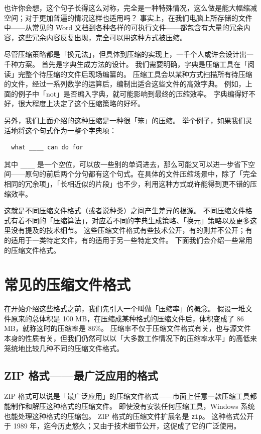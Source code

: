 也许你会想，这个句子长得这么对称，完全是一种特殊情况，这么做是能大幅缩减空间；对于更加普遍的情况这样也适用吗？
事实上，在我们电脑上所存储的文件中——从常见的 Word 文档到各种各样的可执行文件——都包含有大量的冗余内容，这些冗余内容反复出现，完全可以用这种方式被压缩。

尽管压缩策略都是「换元法」，但具体到压缩的实现上，一千个人或许会设计出一千种方案。
首先是字典生成方法的设计。
我们需要明确，字典是压缩工具在「阅读」完整个待压缩的文件后现场编纂的。
压缩工具会以某种方式扫描所有待压缩的文件，经过一系列数学的运算后，编制出适合这些文件的高效字典。
例如，上面的例子中「not」是否编入字典，就可能影响到最终的压缩效率。
字典编得好不好，很大程度上决定了这个压缩策略的好坏。

另外，我们上面介绍的这种压缩是一种很「笨」的压缩。
举个例子，如果我们灵活地将这个句式作为一整个字典项：

\begin{verbatim}
  what ____ can do for
\end{verbatim}

其中 \verb|____| 是一个空位，可以放一些别的单词进去，那么可能又可以进一步省下空间——原句的前后两个分句都有这个句式。在具体的文件压缩场景中，除了「完全相同的冗余项」，「长相近似的片段」也不少，利用这种方式或许能得到更不错的压缩效率。

这就是不同压缩文件格式（或者说种类）之间产生差异的根源。
不同压缩文件格式有着不同的「压缩算法」，对应着不同的字典生成策略、「换元」策略以及更多这里没有提及的技术细节。
这些压缩文件格式有些技术公开，有的则并不公开；有的适用于一类特定文件，有的适用于另一些特定文件。
下面我们会介绍一些常用的压缩文件格式。

\section{常见的压缩文件格式}

在开始介绍这些格式之前，我们先引入一个叫做「压缩率」的概念。
假设一堆文件原来的总体积是 100 MB，在压缩成某种格式的压缩文件后，体积变成了 86 MB，就称这时的压缩率是 86\%。
压缩率不仅于压缩文件格式有关，也与源文件本身的性质有关，但我们仍然可以以「大多数工作情况下的压缩率水平」的高低来笼统地比较几种不同的压缩文件格式。

\subsection{ZIP 格式——最广泛应用的格式}

ZIP 格式可以说是「最广泛应用」的压缩文件格式——市面上任意一款压缩工具都能制作和解压这种格式的压缩文件。
即使没有安装任何压缩工具，Windows 系统也能处理这种格式的压缩包。
ZIP 格式的压缩文件扩展名是 \verb|zip|。
这种格式公开于 1989 年，迄今历史悠久；又由于技术细节公开，这促成了它的广泛使用。


